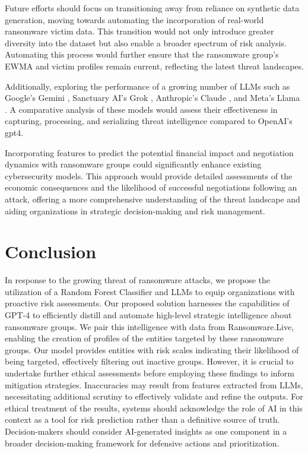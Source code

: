 \documentclass[running heads]{llncs}
\begin{document}
Future efforts should focus on transitioning away from reliance on synthetic data generation, moving towards automating the incorporation of real-world ransomware victim data. This transition would not only introduce greater diversity into the dataset but also enable a broader spectrum of risk analysis. Automating this process would further ensure that the ransomware group's EWMA and victim profiles remain current, reflecting the latest threat landscapes.

Additionally, exploring the performance of a growing number of LLMs such as Google's Gemini \cite{gemini}, Sanctuary AI's Grok \cite{grok}, Anthropic's Claude \cite{anthropic}, and Meta's Llama \cite{llama2}. A comparative analysis of these models would assess their effectiveness in capturing, processing, and serializing threat intelligence compared to OpenAI's gpt4.

Incorporating features to predict the potential financial impact and negotiation dynamics with ransomware groups could significantly enhance existing cybersecurity models. This approach would provide detailed assessments of the economic consequences and the likelihood of successful negotiations following an attack, offering a more comprehensive understanding of the threat landscape and aiding organizations in strategic decision-making and risk management.


\section{Conclusion}
\label{sec:conclusion}
In response to the growing threat of ransomware attacks, we propose the utilization of a Random Forest Classifier and LLMs to equip organizations with proactive risk assessments. Our proposed solution harnesses the capabilities of GPT-4 to efficiently distill and automate high-level strategic intelligence about ransomware groups. We pair this intelligence with data from Ransomware.Live, enabling the creation of profiles of the entities targeted by these ransomware groups. Our model provides entities with risk scales indicating their likelihood of being targeted, effectively filtering out inactive groups. However, it is crucial to undertake further ethical assessments before employing these findings to inform mitigation strategies. Inaccuracies may result from features extracted from LLMs, necessitating additional scrutiny to effectively validate and refine the outputs. For ethical treatment of the results, systems should acknowledge the role of AI in this context as a tool for risk prediction rather than a definitive source of truth. Decision-makers should consider AI-generated insights as one component in a broader decision-making framework for defensive actions and prioritization.
\end{document}

